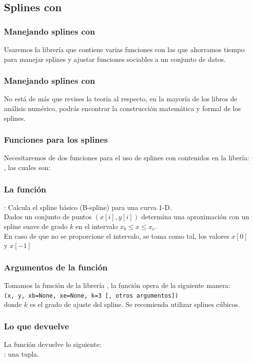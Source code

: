 {\subsection{Splines con \python}
\begin{frame}
\frametitle{Manejando splines con \python}
Usaremos la librería  que contiene varias funciones con las que ahorramos tiempo para manejar splines y ajustar funciones sociables a un conjunto de datos.
\end{frame}
\begin{frame}
\frametitle{Manejando splines con \python}
No está de más que revises la teoría al respecto, en la mayoría de los libros de análisis numérico, podrás encontrar la construcción matemática y formal de los splines.
\end{frame}
\begin{frame}
\frametitle{Funciones para los splines}
Necesitaremos de dos funciones para el uso de splines con \python contenidos en la libería: , las cuales son:
\end{frame}
\begin{frame}
\frametitle{La función }
: Calcula el spline básico (B-spline) para una curva 1-D.
\\
\medskip
Dados un conjunto de puntos $(x[i],y[i])$ determina una aproximación con un spline suave de grado $k$ en el intervalo $x_{b} \leq x \leq x_{e}$.
\\
\medskip
En caso de que no se proporcione el intervalo, se toma como tal, los valores $x[0]$ y $x[-1]$
\end{frame}
\begin{frame}[fragile]
\frametitle{Argumentos de la función }
Tomamos la función de la librería , la función opera de la siguiente manera:
\fontsize{12}{12}\selectfont
\\
\bigskip
{}\texttt{(x, y, xb=None, xe=None, k=3 [, otros argumentos])}
\\
\bigskip
\fontsize{14}{14}\selectfont
donde $k$ es el grado de ajuste del spline. Se recomienda utilizar splines cúbicos.
\end{frame}
\begin{frame}
\frametitle{Lo que devuelve }
La función devuelve lo siguiente:
\\
\bigskip
{} : una tupla.
\\

\end{frame}}
